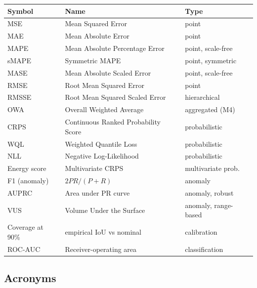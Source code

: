{\def\LTcaptype{none} %
\begin{longtable}[]{@{}
  >{\raggedright\arraybackslash}p{}
  >{\raggedright\arraybackslash}p{}
  >{\raggedright\arraybackslash}p{}@{}}
\toprule\noalign{}
\begin{minipage}[b]{\linewidth}\raggedright
Symbol
\end{minipage} & \begin{minipage}[b]{\linewidth}\raggedright
Name
\end{minipage} & \begin{minipage}[b]{\linewidth}\raggedright
Type
\end{minipage} \\
\midrule\noalign{}
\endhead
\bottomrule\noalign{}
\endlastfoot
MSE & Mean Squared Error & point \\
MAE & Mean Absolute Error & point \\
MAPE & Mean Absolute Percentage Error & point, scale-free \\
sMAPE & Symmetric MAPE & point, symmetric \\
MASE & Mean Absolute Scaled Error & point, scale-free \\
RMSE & Root Mean Squared Error & point \\
RMSSE & Root Mean Squared Scaled Error & hierarchical \\
OWA & Overall Weighted Average & aggregated (M4) \\
CRPS & Continuous Ranked Probability Score & probabilistic \\
WQL & Weighted Quantile Loss & probabilistic \\
NLL & Negative Log-Likelihood & probabilistic \\
Energy score & Multivariate CRPS & multivariate prob. \\
F1 (anomaly) & \(2PR/(P+R)\) & anomaly \\
AUPRC & Area under PR curve & anomaly, robust \\
VUS & Volume Under the Surface & anomaly, range-based \\
Coverage at 90\% & empirical IoU vs nominal & calibration \\
ROC-AUC & Receiver-operating area & classification \\
\end{longtable}
}

\subsection{Acronyms}\label{acronyms}

